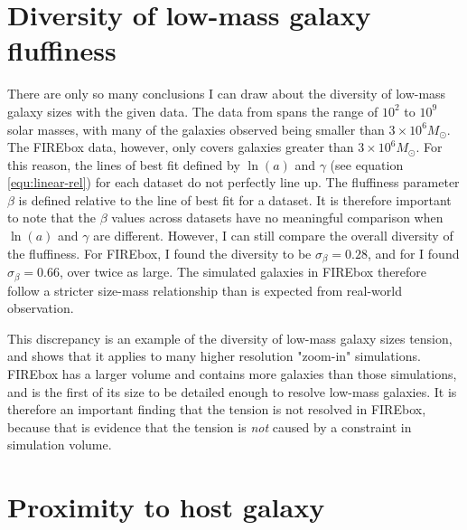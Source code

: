 \section{Diversity of low-mass galaxy fluffiness}


There are only so many conclusions I can draw about the diversity of low-mass galaxy sizes with the given data. The data from \cite{mcconnachieOBSERVEDPROPERTIESDWARF2012} spans the range of $10^2$ to $10^9$ solar masses, with many of the galaxies observed being smaller than $3 \times 10^6 M_\odot$. The FIREbox data, however, only covers galaxies greater than $3 \times 10^6 M_\odot$. For this reason, the lines of best fit defined by $\ln(a)$ and $\gamma$ (see equation \ref{equ:linear-rel}) for each dataset do not perfectly line up. The fluffiness parameter $\beta$ is defined relative to the line of best fit for a dataset. It is therefore important to note that the $\beta$ values across datasets have no meaningful comparison when $\ln(a)$ and $\gamma$ are different. However, I can still compare the overall diversity of the fluffiness. For FIREbox, I found the diversity to be $\sigma_\beta = 0.28$, and for \cite{mcconnachieOBSERVEDPROPERTIESDWARF2012} I found $\sigma_\beta = 0.66$, over twice as large. The simulated galaxies in FIREbox therefore follow a stricter size-mass relationship than is expected from real-world observation.

This discrepancy is an example of the diversity of low-mass galaxy sizes tension, and \cite{salesBaryonicSolutionsChallenges2022} shows that it applies to many higher resolution "zoom-in" simulations. FIREbox has a larger volume and contains more galaxies than those simulations, and is the first of its size to be detailed enough to resolve low-mass galaxies. It is therefore an important finding that the tension is not resolved in FIREbox, because that is evidence that the tension is \emph{not} caused by a constraint in simulation volume.


\section{Proximity to host galaxy}

